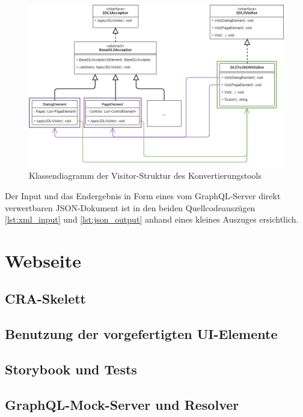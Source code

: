 \begin{figure}
    \centering
    \captionsetup{justification=centering}
    \includegraphics[width=\textwidth]{figures/web-converter_class-diagramm.png}
        \caption{Klassendiagramm der Visitor-Struktur des Konvertierungstools}
        \label{fig:web-conv_class-diagramm}
\end{figure}

Der Input und das Endergebnis in Form eines vom GraphQL-Server direkt verwertbaren JSON-Dokument ist in den beiden Quellcodeauszügen \ref{lst:xml_input} und \ref{lst:json_output} anhand eines kleines Auszuges ersichtlich. 

\begin{minipage}{.5\textwidth}
    
\end{minipage}\hfill
\begin{minipage}{.4\textwidth}
    
\end{minipage}    

\section{Webseite}

\subsection{CRA-Skelett}
\subsection{Benutzung der vorgefertigten UI-Elemente}
\subsection{Storybook und Tests}
\subsection{GraphQL-Mock-Server und Resolver}
